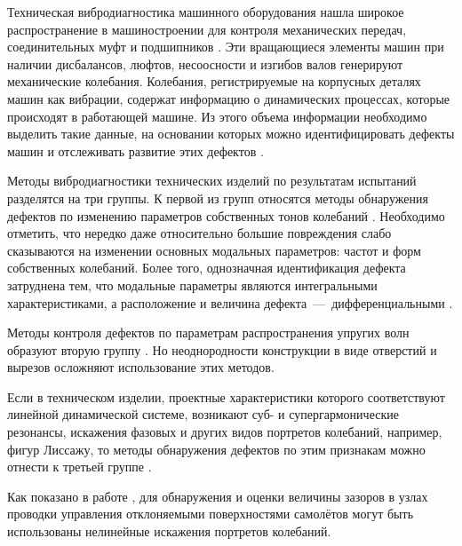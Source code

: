 Техническая вибродиагностика машинного оборудования нашла широкое распространение в машиностроении для контроля механических передач, соединительных муфт и подшипников \cite{lib:defects:Tiwari, lib:defects:Bachschmid, lib:defects:Kostjukov, lib:defects:Balickij, lib:defects:Zhukov}. Эти вращающиеся элементы машин при наличии дисбалансов, люфтов, несоосности и изгибов валов генерируют механические колебания. Колебания, регистрируемые на корпусных деталях машин как вибрации, содержат информацию о динамических процессах, которые происходят в работающей машине. Из этого объема информации необходимо выделить такие данные, на основании которых можно идентифицировать дефекты машин и отслеживать развитие этих дефектов \cite{lib:defects:Zhuge, lib:defects:Lacey, lib:defects:Litak}.

Методы вибродиагностики технических изделий по результатам испытаний разделятся на три группы. К первой из групп относятся методы обнаружения дефектов по изменению параметров собственных тонов колебаний \cite{lib:defects:Kisilev, lib:defects:Postnov, lib:defects:Kosicyn, lib:defects:Perera, lib:defects:Dilena, lib:defects:Xu, lib:defects:Barbieri}. Необходимо отметить, что нередко даже относительно большие повреждения слабо сказываются на изменении основных модальных параметров: частот и форм собственных колебаний. Более того, однозначная идентификация дефекта затруднена тем, что модальные параметры являются интегральными характеристиками, а расположение и величина дефекта~---~дифференциальными \cite{lib:defects:Doebling}.

Методы контроля дефектов по параметрам распространения упругих волн образуют вторую группу \cite{lib:defects:Viktorov, lib:defects:Worlton:ultrasonic, lib:defects:Worlton:experimental, lib:defects:Kessler, lib:defects:Zaitsev}. Но неоднородности конструкции в виде отверстий и вырезов осложняют использование этих методов.

Если в техническом изделии, проектные характеристики которого соответствуют линейной динамической системе, возникают суб- и супергармонические резонансы, искажения фазовых и других видов портретов колебаний, например, фигур Лиссажу, то методы обнаружения дефектов по этим признакам можно отнести к третьей группе \cite{lib:defects:Bovsunovsky, lib:defects:Tsifanskiy, lib:defects:Diana, lib:defects:Berns:align, lib:defects:Berns:backlash, lib:defects:AlKhazali, lib:defects:Berns:gap, lib:defects:Berns:experience, lib:defects:Berns:cracks}.

Как показано в работе \cite{lib:defects:Berns:experience}, для обнаружения и оценки величины зазоров в узлах проводки управления отклоняемыми поверхностями самолётов могут быть использованы нелинейные искажения портретов колебаний.

